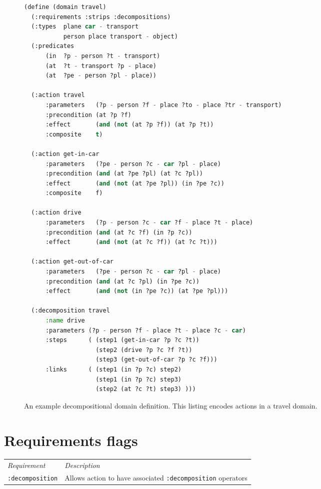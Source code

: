 \documentclass[10pt]{article}
\begin{document}
\begin{figure}[h!]
\begin{lstlisting}[language=Lisp]
(define (domain travel)
  (:requirements :strips :decompositions)
  (:types  plane car - transport 
           person place transport - object)
  (:predicates
      (in  ?p - person ?t - transport)
      (at  ?t - transport ?p - place)
      (at  ?pe - person ?pl - place))

  (:action travel
      :parameters   (?p - person ?f - place ?to - place ?tr - transport)
      :precondition (at ?p ?f)
      :effect       (and (not (at ?p ?f)) (at ?p ?t))
      :composite    t)

  (:action get-in-car
      :parameters   (?pe - person ?c - car ?pl - place)
      :precondition (and (at ?pe ?pl) (at ?c ?pl))
      :effect       (and (not (at ?pe ?pl)) (in ?pe ?c))
      :composite    f)
                      
  (:action drive
      :parameters   (?p - person ?c - car ?f - place ?t - place)
      :precondition (and (at ?c ?f) (in ?p ?c))
      :effect       (and (not (at ?c ?f)) (at ?c ?t)))

  (:action get-out-of-car
      :parameters   (?pe - person ?c - car ?pl - place)
      :precondition (and (at ?c ?pl) (in ?pe ?c))
      :effect       (and (not (in ?pe ?c)) (at ?pe ?pl)))

  (:decomposition travel
      :name drive
      :parameters (?p - person ?f - place ?t - place ?c - car)
      :steps      ( (step1 (get-in-car ?p ?c ?t))
                    (step2 (drive ?p ?c ?f ?t))
                    (step3 (get-out-of-car ?p ?c ?f)))
      :links      ( (step1 (in ?p ?c) step2)
                    (step1 (in ?p ?c) step3)
                    (step2 (at ?c ?t) step3) )))
\end{lstlisting}
\caption{An example decompositional domain definition. This listing encodes actions in a travel domain.}
\label{figure:example}
\end{figure}

\section{Requirements flags}

\begin{tabular}{l p{12cm}}
\textit{Requirement} & \textit{Description} \\ 
\texttt{:decomposition} & Allows action to have associated \texttt{:decomposition} operators \\ 

\end{tabular} 
\end{document}
